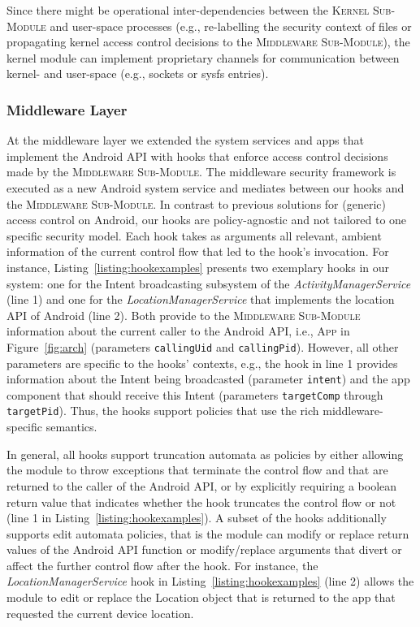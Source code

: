 \documentclass[letterpaper,twocolumn,10pt]{article}
\newcommand{\KMODULE}{\textsc{Kernel Sub-Module}\xspace}
\newcommand{\MMODULE}{\textsc{Middleware Sub-Module}\xspace}
\begin{document}
Since there might be operational inter-dependencies between the \KMODULE and user-space processes (e.g., re-labelling the security context of files or propagating kernel access control decisions to the \MMODULE), the kernel module can implement proprietary channels for communication between kernel- and user-space (e.g., sockets or sysfs entries).

\subsubsection{Middleware Layer}

At the middleware layer we extended the system services and apps that implement the Android API with hooks that enforce access control decisions made by the \MMODULE. The middleware security framework is executed as a new Android system service and mediates between our hooks and the \MMODULE. In contrast to previous solutions for (generic) access control on Android, our hooks are policy-agnostic and not tailored to one specific security model. Each hook takes as arguments all relevant, ambient information of the current control flow that led to the hook's invocation. For instance, Listing~\ref{listing:hookexamples} presents two exemplary hooks in our system: one for the Intent broadcasting subsystem of the \textit{ActivityManagerService} (line 1) and one for the \textit{LocationManagerService} that implements the location API of Android (line 2). Both provide to the \MMODULE information about the current caller to the Android API, i.e., \textsc{App} in Figure~\ref{fig:arch} (parameters \texttt{callingUid} and \texttt{callingPid}). However, all other parameters are specific to the hooks' contexts, e.g., the hook in line 1 provides information about the Intent being broadcasted (parameter \texttt{intent}) and the app component that should receive this Intent (parameters \texttt{targetComp} through \texttt{targetPid}). Thus, the hooks support policies that use the rich middleware-specific semantics.

In general, all hooks support truncation automata as policies by either allowing the module to throw exceptions that terminate the control flow and that are returned to the caller of the Android API, or by explicitly requiring a boolean return value that indicates whether the hook truncates the control flow or not (line 1 in Listing~\ref{listing:hookexamples}). A subset of the hooks additionally supports edit automata policies, that is the module can modify or replace return values of the Android API function or modify/replace arguments that divert or affect the further control flow after the hook. For instance, the \textit{LocationManagerService} hook in Listing~\ref{listing:hookexamples} (line 2) allows the module to edit or replace the Location object that is returned to the app that requested the current device location.
\end{document}

